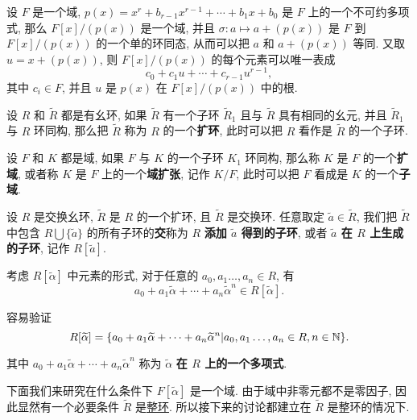 \begin{theorem}
	设 $F$ 是一个域, $p(x)=x^r+b_{r-1}x^{r-1}+\cdots+b_1x+b_0$ 是 $F$ 上的一个不可约多项式, 那么 $F[x]/(p(x))$ 是一个域, 并且 $\sigma:a\mapsto a+(p(x))$ 是 $F$ 到 $F[x]/(p(x))$ 的一个单的环同态, 从而可以把 $a$ 和 $a+(p(x))$ 等同. 又取 $u=x+(p(x))$, 则 $F[x]/(p(x))$ 的每个元素可以唯一表成 $$c_0+c_1u+\cdots+c_{r-1}u^{r-1},$$ 其中 $c_i\in F$, 并且 $u$ 是 $p(x)$ 在 $F[x]/(p(x))$ 中的根.
\end{theorem}

\begin{definition}\label{扩环}
	设 $R$ 和 $\widetilde{R}$ 都是有幺环, 如果 $\widetilde{R}$ 有一个子环 $\widetilde{R}_1$ 且与 $\widetilde{R}$ 具有相同的幺元, 并且 $\widetilde{R}_1$ 与 $R$ 环同构, 那么把 $\widetilde{R}$ 称为 $R$ 的一个\textbf{扩环}, 此时可以把 $R$ 看作是 $\widetilde{R}$ 的一个子环.
\end{definition}

\begin{definition}\label{域扩张}
	设 $F$ 和 $K$ 都是域, 如果 $F$ 与 $K$ 的一个子环 $K_1$ 环同构, 那么称 $K$ 是 $F$ 的一个\textbf{扩域}, 或者称 $K$ 是 $F$ 上的一个\textbf{域扩张}, 记作 $K/F$, 此时可以把 $F$ 看成是 $K$ 的一个\textbf{子域}.
\end{definition}

\begin{definition}\label{元素生成的子环}
	设 $R$ 是交换幺环, $\widetilde{R}$ 是 $R$ 的一个扩环, 且 $\widetilde{R}$ 是交换环. 任意取定 $\widetilde{a}\in\widetilde{R}$, 我们把 $\widetilde{R}$ 中包含 $R\bigcup \{\widetilde{a}\}$ 的所有子环的\textbf{交}称为 $R$ \textbf{添加 $\widetilde{a}$ 得到的子环}, 或者 \textbf{$\widetilde{a}$ 在 $R$ 上生成的子环}, 记作 $R[\widetilde{a}]$.
\end{definition}

\begin{definition}\label{元素在R上的多项式}
	考虑 $R[\widetilde{\alpha}]$ 中元素的形式, 对于任意的 $a_0,a_1\ldots,a_n\in R$, 有 $$a_0+a_1\widetilde{\alpha}+\cdots+a_n\widetilde{\alpha}^n\in R[\widetilde{\alpha}].$$

	容易验证 $$R[\widetilde{\alpha}]=\{a_0+a_1\widetilde{\alpha}+\cdots+a_n\widetilde{\alpha}^n|a_0,a_1\ldots,a_n\in R,n\in \mathbb N\}.$$

	其中 $a_0+a_1\widetilde{\alpha}+\cdots+a_n\widetilde{\alpha}^n$ 称为 $\widetilde{\alpha}$ \textbf{在 $R$ 上的一个多项式}.
\end{definition}

下面我们来研究在什么条件下 $F[\widetilde{\alpha}]$ 是一个域. 由于域中非零元都不是零因子, 因此显然有一个必要条件 $\widetilde{R}$ 是\hyperref[整环]{整环}. 所以接下来的讨论都建立在 $\widetilde{R}$ 是整环的情况下.

